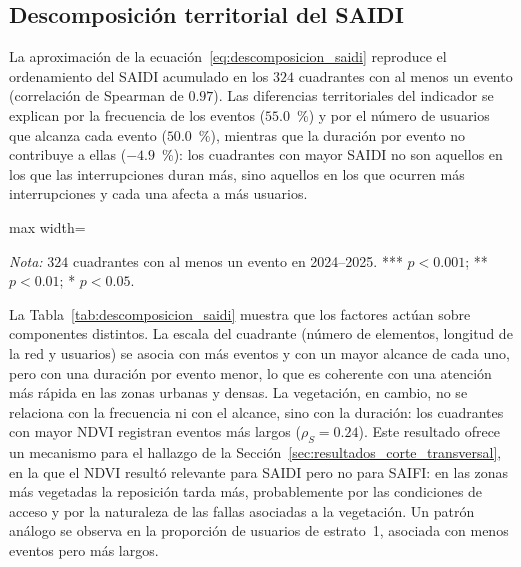 \begin{table}[!htbp]
\centering
\small
\caption{Corte transversal de SAIDI promedio por cuadrante, OLS completo ($N=344$; $R^2=0{.}890$)}
\label{tab:cross_section_saidi}

\end{table}

\begin{table}[!htbp]
\centering
\small
\caption{Corte transversal de SAIFI promedio por cuadrante, OLS completo ($N=344$; $R^2=0{.}836$)}
\label{tab:cross_section_saifi}

\end{table}

\subsection{Descomposición territorial del SAIDI}
\label{sec:resultados_descomposicion}

La aproximación de la ecuación~\eqref{eq:descomposicion_saidi} reproduce el ordenamiento del SAIDI acumulado en los $324$ cuadrantes con al menos un evento (correlación de Spearman de $0{.}97$). Las diferencias territoriales del indicador se explican por la frecuencia de los eventos ($55{.}0$~\%) y por el número de usuarios que alcanza cada evento ($50{.}0$~\%), mientras que la duración por evento no contribuye a ellas ($-4{.}9$~\%): los cuadrantes con mayor SAIDI no son aquellos en los que las interrupciones duran más, sino aquellos en los que ocurren más interrupciones y cada una afecta a más usuarios.

\begin{table}[!htbp]
\centering
\small
\caption{Correlación de Spearman entre los factores estructurales del cuadrante y los componentes del SAIDI}
\label{tab:descomposicion_saidi}
\begin{adjustbox}{max width=\linewidth}

\end{adjustbox}

\vspace{2pt}
\noindent\footnotesize\textit{Nota:} $324$ cuadrantes con al menos un evento en 2024--2025. *** $p<0{.}001$; ** $p<0{.}01$; * $p<0{.}05$.
\end{table}

La Tabla~\ref{tab:descomposicion_saidi} muestra que los factores actúan sobre componentes distintos. La escala del cuadrante (número de elementos, longitud de la red y usuarios) se asocia con más eventos y con un mayor alcance de cada uno, pero con una duración por evento menor, lo que es coherente con una atención más rápida en las zonas urbanas y densas. La vegetación, en cambio, no se relaciona con la frecuencia ni con el alcance, sino con la duración: los cuadrantes con mayor NDVI registran eventos más largos ($\rho_S=0{.}24$). Este resultado ofrece un mecanismo para el hallazgo de la Sección~\ref{sec:resultados_corte_transversal}, en la que el NDVI resultó relevante para SAIDI pero no para SAIFI: en las zonas más vegetadas la reposición tarda más, probablemente por las condiciones de acceso y por la naturaleza de las fallas asociadas a la vegetación. Un patrón análogo se observa en la proporción de usuarios de estrato~1, asociada con menos eventos pero más largos.

